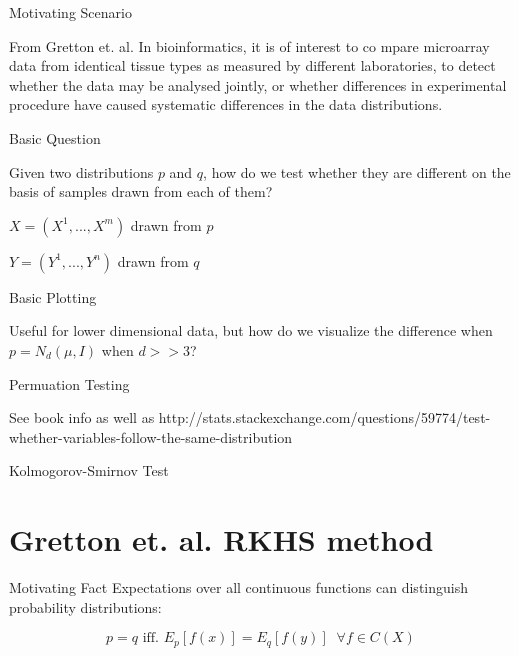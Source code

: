 \documentclass{beamer}
\begin{document}
\begin{frame}{Motivating Scenario}

\begin{block}{
From Gretton et. al.}
In bioinformatics,  it is of interest to co
mpare microarray
data from identical tissue types as measured by different laboratories, to
detect whether the data
may be analysed jointly, or whether differences in experimental procedure have caused systematic
differences in the data distributions.
\end{block}

\end{frame}


\begin{frame}{Basic Question}

Given two distributions $p$ and $q$, how do we test whether they are different on the basis of samples drawn from each of them?

$X = (X^1, ... , X^m)$ drawn from $p$

$Y = (Y^1, ..., Y^n)$ drawn from $q$

\end{frame}


\begin{frame}{Basic Plotting}

Useful for lower dimensional data, but how do we visualize the difference when $p = N_d(\mu, I)$ when $d >> 3$?

\end{frame}


\begin{frame}{Permuation Testing}

See book info as well as http://stats.stackexchange.com/questions/59774/test-whether-variables-follow-the-same-distribution

\end{frame}


\begin{frame}{Kolmogorov-Smirnov Test}

\end{frame}


\section{Gretton et. al. RKHS method}
\begin{frame}{Motivating Fact}
 Expectations over all continuous functions can distinguish probability distributions:
 
 $$p = q \text{ iff. }  E_p[f(x)] = E_q[f(y)] \;\; \forall f \in C(X)$$
\end{frame}
\end{document}
